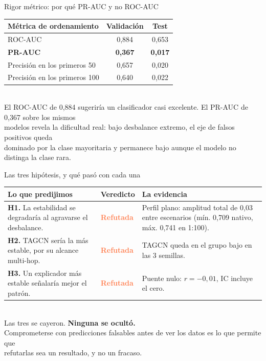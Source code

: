 \documentclass[aspectratio=169,10pt]{beamer}
\begin{document}
\begin{frame}{Rigor métrico: por qué PR-AUC y no ROC-AUC}
\begin{center}
\small
\renewcommand{\arraystretch}{1.35}
\begin{tabular}{lcc}
\toprule
\textbf{Métrica de ordenamiento} & \textbf{Validación} & \textbf{Test} \\
\midrule
ROC-AUC & 0,884 & 0,653 \\
\textbf{PR-AUC} & \textbf{0,367} & \textbf{0,017} \\
Precisión en los primeros 50 & 0,657 & 0,020 \\
Precisión en los primeros 100 & 0,640 & 0,022 \\
\bottomrule
\end{tabular}
\\[9pt]
\footnotesize
El ROC-AUC de 0,884 sugeriría un clasificador casi excelente. El PR-AUC de 0,367 sobre los mismos\\
modelos revela la dificultad real: bajo desbalance extremo, el eje de falsos positivos queda\\
dominado por la clase mayoritaria y permanece bajo aunque el modelo no distinga la clase rara.
\end{center}
\end{frame}

\begin{frame}{Las tres hipótesis, y qué pasó con cada una}
\begin{center}
\small
\renewcommand{\arraystretch}{1.7}
\begin{tabular}{p{}p{}p{}}
\toprule
\textbf{Lo que predijimos} & \textbf{Veredicto} & \textbf{La evidencia} \\
\midrule
\textbf{H1.} La estabilidad se degradaría al agravarse el desbalance. & \textcolor{coral}{\textbf{Refutada}} & Perfil plano: amplitud total de 0,03 entre escenarios (mín. 0,709 nativo, máx. 0,741 en 1:100). \\
\textbf{H2.} TAGCN sería la más estable, por su alcance multi-hop. & \textcolor{coral}{\textbf{Refutada}} & TAGCN queda en el grupo bajo en las 3 semillas. \\
\textbf{H3.} Un explicador más estable señalaría mejor el patrón. & \textcolor{coral}{\textbf{Refutada}} & Puente nulo: $r=-0{,}01$, IC incluye el cero. \\
\bottomrule
\end{tabular}
\\[10pt]
\footnotesize
Las tres se cayeron. \textbf{Ninguna se ocultó.}\\
Comprometerse con predicciones falsables antes de ver los datos es lo que permite que\\
refutarlas sea un resultado, y no un fracaso.
\end{center}
\end{frame}
\end{document}
